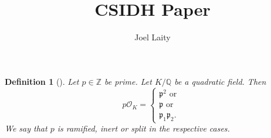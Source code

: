 \documentclass[10pt]{article}
\title{CSIDH Paper}
\author{Joel Laity}
\theoremstyle{plain}
\newtheorem{definition}[theorem]{Definition}
\theoremstyle{definition}
\newcommand{\Z}{\mathbb{Z}}
\newcommand{\Q}{\mathbb{Q}}
\begin{document}
\maketitle
\tableofcontents

\begin{definition}[]
    Let \( p \in \Z \) be prime.
    Let \( K / \Q \) be a quadratic field.
    Then
    \[
        p\mathcal{O}_K =
        \begin{cases}
            \mathfrak{p}^2 \text{ or }    \\
            \mathfrak{p} \text{ or }      \\
            \mathfrak{p}_1\mathfrak{p}_2.
        \end{cases}
    \]
    We say that \( p \) is ramified, inert or split in the respective cases.
\end{definition}
\end{document}
